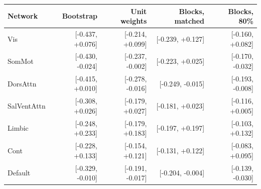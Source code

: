 \begin{tabular}{lrrrr}
\toprule
Network & Bootstrap & Unit weights & Blocks, matched & Blocks, 80\% \\
\midrule
Vis & [-0.437, +0.076] & [-0.214, +0.099] & [-0.239, +0.127] & [-0.160, +0.082] \\
SomMot & [-0.430, -0.024] & [-0.237, -0.002] & [-0.223, +0.025] & [-0.170, -0.032] \\
DorsAttn & [-0.415, +0.010] & [-0.278, -0.016] & [-0.249, -0.015] & [-0.193, -0.008] \\
SalVentAttn & [-0.308, +0.026] & [-0.179, +0.027] & [-0.181, +0.023] & [-0.116, +0.005] \\
Limbic & [-0.248, +0.233] & [-0.179, +0.183] & [-0.197, +0.197] & [-0.103, +0.132] \\
Cont & [-0.228, +0.133] & [-0.154, +0.121] & [-0.131, +0.122] & [-0.083, +0.095] \\
Default & [-0.329, -0.010] & [-0.191, -0.017] & [-0.204, -0.004] & [-0.139, -0.030] \\
\bottomrule
\end{tabular}
